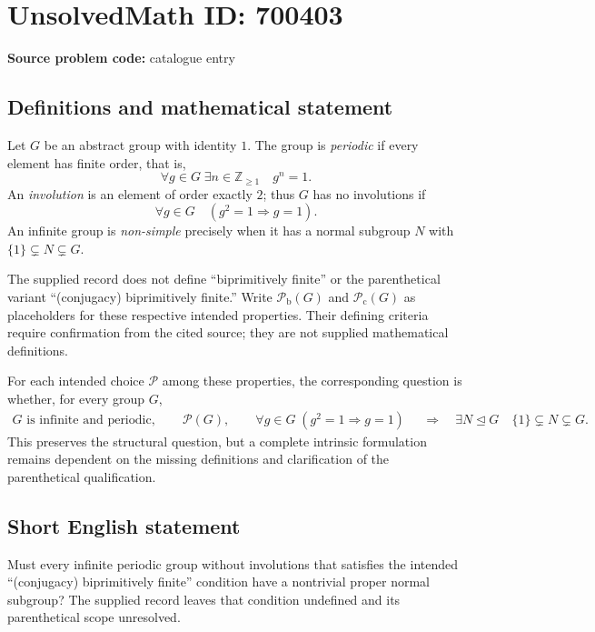 \documentclass[11pt]{article}
\newcommand{\Z}{\mathbb{Z}}
\begin{document}
\section*{UnsolvedMath ID: 700403}
\textbf{Source problem code:} catalogue entry
\subsection{Definitions and mathematical statement}
Let \(G\) be an abstract group with identity \(1\). The group is \emph{periodic} if every element has finite order, that is,
\[
\forall g\in G\;\exists n\in\Z_{\geq 1}\quad g^n=1.
\]
An \emph{involution} is an element of order exactly \(2\); thus \(G\) has no involutions if
\[
\forall g\in G\quad (g^2=1\Longrightarrow g=1).
\]
An infinite group is \emph{non-simple} precisely when it has a normal subgroup \(N\) with \(\{1\}\subsetneq N\subsetneq G\).

The supplied record does not define ``biprimitively finite'' or the parenthetical variant ``(conjugacy) biprimitively finite.'' Write \(\mathcal P_{\mathrm b}(G)\) and \(\mathcal P_{\mathrm c}(G)\) as placeholders for these respective intended properties. Their defining criteria require confirmation from the cited source; they are not supplied mathematical definitions.

For each intended choice \(\mathcal P\) among these properties, the corresponding question is whether, for every group \(G\),
\[
\begin{gathered}
G\text{ is infinite and periodic},\qquad
\mathcal P(G),\qquad
\forall g\in G\;(g^2=1\Longrightarrow g=1)
\end{gathered}
\quad\Longrightarrow\quad
\exists N\trianglelefteq G\quad \{1\}\subsetneq N\subsetneq G.
\]
This preserves the structural question, but a complete intrinsic formulation remains dependent on the missing definitions and clarification of the parenthetical qualification.
\subsection{Short English statement}
Must every infinite periodic group without involutions that satisfies the intended ``(conjugacy) biprimitively finite'' condition have a nontrivial proper normal subgroup? The supplied record leaves that condition undefined and its parenthetical scope unresolved.
\end{document}
